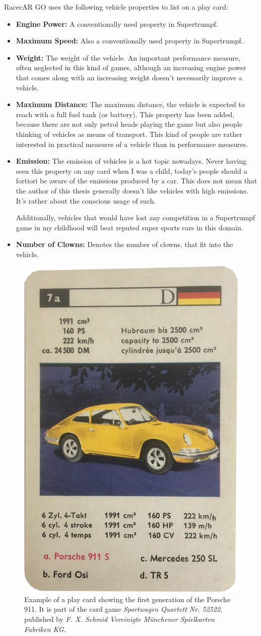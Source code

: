 RacecAR GO uses the following vehicle properties to list on a play card:
\begin{itemize}
  \item\textbf{Engine Power:} A conventionally used property in Supertrumpf.
  \item\textbf{Maximum Speed:} Also a conventionally used property in Supertrumpf.
  \item\textbf{Weight:} The weight of the vehicle. An important performance measure, often neglected in this kind of games, although an increasing engine power that comes along with an increasing weight doesn't necessarily improve a vehicle.
  \item\textbf{Maximum Distance:} The maximum distance, the vehicle is expected to reach with a full fuel tank (or battery). This property has been added, because there are not only petrol heads playing the game but also people thinking of vehicles as means of transport. This kind of people are rather interested in practical measures of a vehicle than in performance measures.
  \item\textbf{Emission:} The emission of vehicles is a hot topic nowadays. Never having seen this property on any card when I was a child, today's people should a fortiori be aware of the emissions produced by a car. This does not mean that the author of this thesis generally doesn't like vehicles with high emissions. It's rather about the conscious usage of such.

Additionally, vehicles that would have lost any competition in a Supertrumpf game in my childhood will beat reputed super sports cars in this domain.
  \item\textbf{Number of Clowns:} Denotes the number of clowns, that fit into the vehicle.
\end{itemize}
\begin{figure}[btph]
  \centering
        \includegraphics[width=.25\linewidth]{gfx/playcard}
        \caption{Example of a play card showing the first generation of the Porsche 911. It is part of the card game \emph{Sportwagen Quartett Nr. 52522}, published by \emph{F. X. Schmid Vereinigte M\"unchener Spielkarten Fabriken KG}.}
        \label{fig:playcard}
\end{figure}

